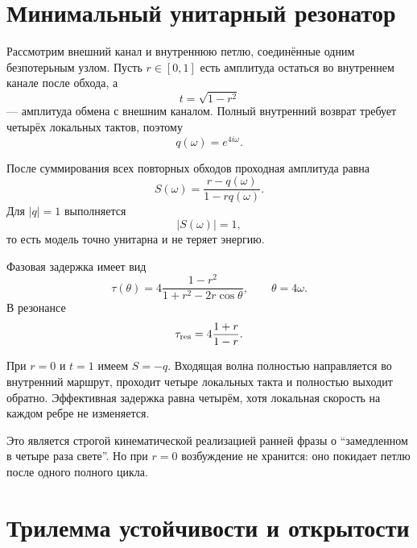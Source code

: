 \section{Минимальный унитарный резонатор}

Рассмотрим внешний канал и внутреннюю петлю, соединённые одним
безпотерьным узлом. Пусть $r\in[0,1]$ есть амплитуда остаться во внутреннем
канале после обхода, а
\begin{equation}
 t=\sqrt{1-r^2}
\end{equation}
--- амплитуда обмена с внешним каналом. Полный внутренний возврат требует
четырёх локальных тактов, поэтому
\begin{equation}
 q(\omega)=e^{4i\omega}.
\end{equation}

После суммирования всех повторных обходов проходная амплитуда равна
\begin{equation}
 S(\omega)=\frac{r-q(\omega)}{1-rq(\omega)}.
 \label{eq:v5-ring-scattering}
\end{equation}
Для $|q|=1$ выполняется
\begin{equation}
 |S(\omega)|=1,
\end{equation}
то есть модель точно унитарна и не теряет энергию.

Фазовая задержка имеет вид
\begin{equation}
 \tau(\theta)=
 4\frac{1-r^2}{1+r^2-2r\cos\theta},
 \qquad \theta=4\omega.
 \label{eq:v5-ring-group-delay}
\end{equation}
В резонансе
\begin{equation}
 \tau_{\rm res}=4\frac{1+r}{1-r}.
 \label{eq:v5-ring-resonant-delay}
\end{equation}

\begin{proposition}
При $r=0$ и $t=1$ имеем $S=-q$. Входящая волна полностью направляется во
внутренний маршрут, проходит четыре локальных такта и полностью выходит
обратно. Эффективная задержка равна четырём, хотя локальная скорость на
каждом ребре не изменяется.
\end{proposition}

Это является строгой кинематической реализацией ранней фразы о
``замедленном в четыре раза свете''. Но при $r=0$ возбуждение не хранится:
оно покидает петлю после одного полного цикла.

\section{Трилемма устойчивости и открытости}

